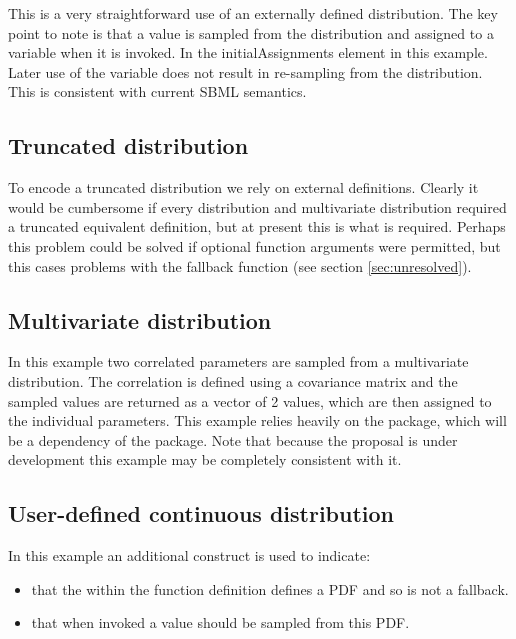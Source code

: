 \documentclass[draftspec]{sbmlpkgspec}
\begin{document}
This is a very straightforward use of an externally defined
distribution. The key point to note is that a value is sampled from
the distribution and assigned to a variable when it is invoked. In the
initialAssignments element in this example. Later use of the variable
does not result in re-sampling from the distribution. This is
consistent with current SBML semantics.


\subsection{Truncated distribution}
\label{sec: truncated-eg}

To encode a truncated distribution we rely on external
definitions. Clearly it would be cumbersome if every distribution and
multivariate distribution required a truncated equivalent definition,
but at present this is what is required\contraversial. Perhaps this
problem could be solved if optional function arguments were permitted,
but this cases problems with the fallback function (see section \ref{sec:unresolved}).


\subsection{Multivariate distribution}

In this example two correlated parameters are sampled from a
multivariate distribution. The correlation is defined using a
covariance matrix and the sampled values are returned as a vector of 2
values, which are then assigned to the individual parameters. This
example relies heavily on the \arraysshort package, which will be a
dependency of the \distribshort package. Note that because the
\arraysshort proposal is under development this example may be
completely consistent with it.


\subsection{User-defined continuous distribution }

In this example an additional construct is used to indicate:
\begin{itemize}
\item that the \mathml within the function definition defines a PDF and so is not a
fallback.
\item that when invoked a value should be sampled from this PDF.
\end{itemize}
\end{document}
